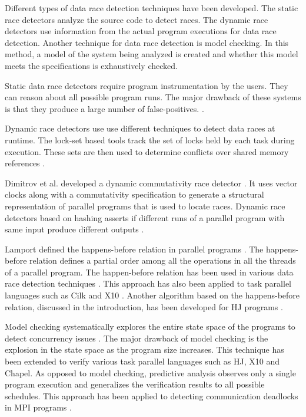 Different types of data race detection techniques have been developed. The static race detectors analyze the source code to detect races. The dynamic race detectors use information from the actual program executions for data race detection. Another technique for data race detection is model checking. In this method, a model of the system being analyzed is created and whether this model meets the specifications is exhaustively checked.

Static data race detectors require program instrumentation by the users. They can reason about all possible program runs. The major drawback of these systems is that they produce a large number of false-positives. \cite{engler2003racerx,ESC,abadi2006types,naik2006effective,voung2007relay,choi2001static, vechev2011automatic}. 

Dynamic race detectors use use different techniques to detect data races at runtime. The lock-set based tools track the set of locks held by each task during execution. These sets are then used to determine conflicts over shared memory references \cite{savage1997eraser, EraserUpgrade, elmas2006goldilocks, elmas2007goldilocks}. 

Dimitrov et al. developed a dynamic commutativity race detector \cite{dimitrov2014commutativity}. It uses vector clocks along with a commutativity specification to generate a structural representation of parallel programs that is used to locate races. Dynamic race detectors based on hashing asserts if different runs of a parallel program with same input produce different outputs \cite{nistor2010instantcheck}.

Lamport defined the happens-before relation in parallel programs \cite{lamport1978time}. The happens-before relation defines a partial order among all the operations in all the threads of a parallel program. The happen-before relation has been used in various data race detection techniques \cite{kahlon2009static, kahlon2010universal, flanagan2009fasttrack, mellor1991fly, schonberg1989fly, miller1988mechanism}. This approach has also been applied to task parallel languages such as Cilk and X10 \cite{Feng97efficientdetection, Async-Finish-Race}. Another algorithm based on the happens-before relation, discussed in the introduction, has been developed for HJ programs \cite{raman2012scalable}. 

Model checking systematically explores the entire state space of the programs to detect concurrency issues \cite{kulikov2010detecting, vakkalanka2008implementing, Godefroid}. The major drawback of model checking is the explosion in the state space as the program size increases. This technique has been extended to verify various task parallel languages such as HJ, X10 and Chapel\cite{anderson2014jpf, gligoric2012x10x, zirkel2013automated}. As opposed to model checking, predictive analysis observes only a single program execution and generalizes the verification results to all possible schedules. This approach has been applied to detecting communication deadlocks in MPI programs \cite{forejt2014precise}.

